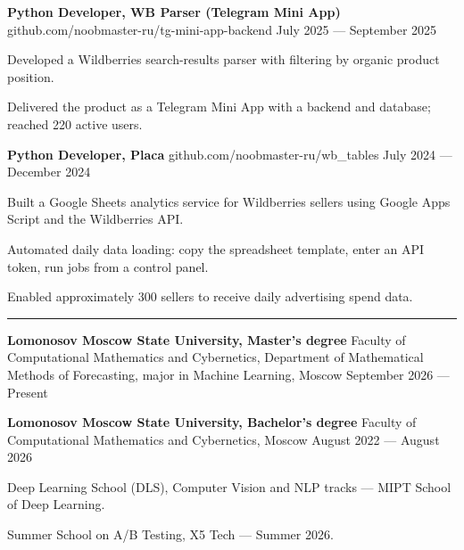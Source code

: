 \documentclass[10pt,a4paper]{article}
\newcommand{\cvsection}[1]{%
  \vspace{7pt}{\large\bfseries #1}\par\vspace{2pt}\hrule\vspace{4pt}}
\newcommand{\cventry}[3]{%
  \textbf{#1} \textbar{} #3 \textbar{} #2\par\vspace{2pt}}
\begin{document}
\cventry{Python Developer, WB Parser (Telegram Mini App)}{July 2025 --- September 2025}{github.com/noobmaster-ru/tg-mini-app-backend}
\begin{cvitems}
    \item Developed a Wildberries search-results parser with filtering by organic product position.
    \item Delivered the product as a Telegram Mini App with a backend and database; reached 220 active users.
\end{cvitems}
\vspace{4pt}

\cventry{Python Developer, Placa}{July 2024 --- December 2024}{github.com/noobmaster-ru/wb\_tables}
\begin{cvitems}
    \item Built a Google Sheets analytics service for Wildberries sellers using Google Apps Script and the Wildberries API.
    \item Automated daily data loading: copy the spreadsheet template, enter an API token, run jobs from a control panel.
    \item Enabled approximately 300 sellers to receive daily advertising spend data.
\end{cvitems}

\cvsection{Education}
\cventry{Lomonosov Moscow State University, Master's degree}{September 2026 --- Present}{Faculty of Computational Mathematics and Cybernetics, Department of Mathematical Methods of Forecasting, major in Machine Learning, Moscow}
\vspace{2pt}
\cventry{Lomonosov Moscow State University, Bachelor's degree}{August 2022 --- August 2026}{Faculty of Computational Mathematics and Cybernetics, Moscow}
\begin{cvitems}
    \item Deep Learning School (DLS), Computer Vision and NLP tracks --- MIPT School of Deep Learning.
    \item Summer School on A/B Testing, X5 Tech --- Summer 2026.
\end{cvitems}
\end{document}
